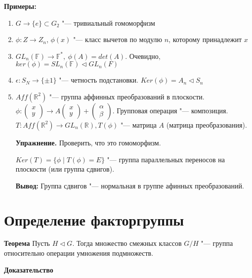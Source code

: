 \documentclass{article}
\begin{document}
\textbf{Примеры: }
\begin{enumerate}
	\item $G \rightarrow \{e\} \subset G_2$ "--- тривиальный гомоморфизм
	\item $\phi: Z \rightarrow Z_n$, $\phi(x)$ "--- класс вычетов по модулю $n$, которому принадлежит $x$
	\item $GL_n(\mathbb{F}) \rightarrow \mathbb{F}^*,\  \phi(A) = det(A)$. Очевидно, $ker(\phi) = SL_n(\mathbb{F}) \triangleleft GL_n(F)$
	\item $\epsilon: S_N \rightarrow \{ \pm 1\}$ "--- четность подстановки. $Ker(\phi) = A_n \triangleleft S_n$
	\item $Aff(\mathbb{R}^2)$ "--- группа аффинных преобразований в плоскости. $\phi: \begin{pmatrix} x \\ y \end{pmatrix} \rightarrow A \begin{pmatrix} x \\ y \end{pmatrix} + \begin{pmatrix} \alpha \\ \beta\end{pmatrix}$. Групповая операция "--- композиция.
	$T: Aff(\mathbb{R}^2) \rightarrow GL_n(\mathbb{R}), T(\phi)$ "--- матрица $A$ (матрица преобразования).

\vspace{10pt}

	\textbf{Упражнение.} Проверить, что это гомоморфизм.
	
	$Ker(T) = \{\phi \mid T(\phi) = E\}$ "--- группа параллельных переносов на плоскости (или группа сдвигов).

\vspace{10pt}
	
	\textbf{Вывод:} Группа сдвигов "--- нормальная в группе афинных преобразований.
\end{enumerate}

\section{Определение факторгруппы}

\textbf{Теорема}
Пусть $H \triangleleft G$. Тогда множество смежных классов $G/H$ "--- группа относительно операции умножения подмножеств.

\vspace{5pt}

\textbf{Доказательство}
\end{document}
